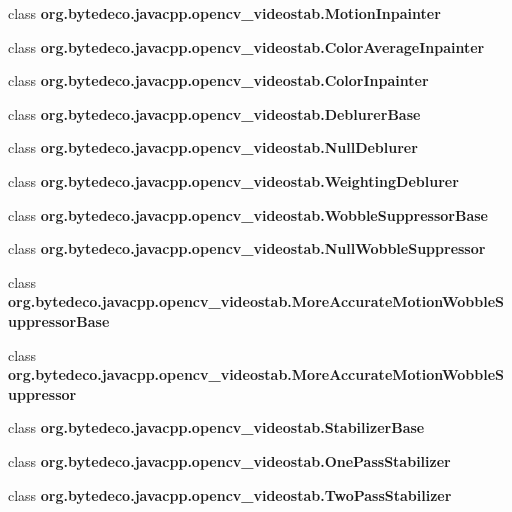 \begin{DoxyCompactItemize}
\item 
class {\bfseries org.\+bytedeco.\+javacpp.\+opencv\+\_\+videostab.\+Motion\+Inpainter}
\item 
class {\bfseries org.\+bytedeco.\+javacpp.\+opencv\+\_\+videostab.\+Color\+Average\+Inpainter}
\item 
class {\bfseries org.\+bytedeco.\+javacpp.\+opencv\+\_\+videostab.\+Color\+Inpainter}
\item 
class {\bfseries org.\+bytedeco.\+javacpp.\+opencv\+\_\+videostab.\+Deblurer\+Base}
\item 
class {\bfseries org.\+bytedeco.\+javacpp.\+opencv\+\_\+videostab.\+Null\+Deblurer}
\item 
class {\bfseries org.\+bytedeco.\+javacpp.\+opencv\+\_\+videostab.\+Weighting\+Deblurer}
\item 
class {\bfseries org.\+bytedeco.\+javacpp.\+opencv\+\_\+videostab.\+Wobble\+Suppressor\+Base}
\item 
class {\bfseries org.\+bytedeco.\+javacpp.\+opencv\+\_\+videostab.\+Null\+Wobble\+Suppressor}
\item 
class {\bfseries org.\+bytedeco.\+javacpp.\+opencv\+\_\+videostab.\+More\+Accurate\+Motion\+Wobble\+Suppressor\+Base}
\item 
class {\bfseries org.\+bytedeco.\+javacpp.\+opencv\+\_\+videostab.\+More\+Accurate\+Motion\+Wobble\+Suppressor}
\item 
class {\bfseries org.\+bytedeco.\+javacpp.\+opencv\+\_\+videostab.\+Stabilizer\+Base}
\item 
class {\bfseries org.\+bytedeco.\+javacpp.\+opencv\+\_\+videostab.\+One\+Pass\+Stabilizer}
\item 
class {\bfseries org.\+bytedeco.\+javacpp.\+opencv\+\_\+videostab.\+Two\+Pass\+Stabilizer}
\end{DoxyCompactItemize}
